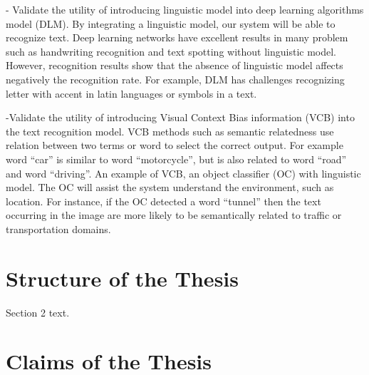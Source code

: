 \documentclass[phd,tocprelim]{cornell}
\begin{document}


- Validate the utility of introducing linguistic model into deep learning algorithms model (DLM). By integrating a linguistic model, our system will be able to recognize text. Deep learning networks have excellent results in many problem such as handwriting recognition and text spotting without linguistic model. However, recognition results show that the absence of linguistic model affects negatively the recognition rate. For example, DLM has challenges recognizing letter with accent in latin languages or symbols in a text. %

-Validate the utility of introducing Visual Context Bias information (VCB) into the text recognition model. VCB methods such as semantic relatedness \cite{leong2011measuring} use relation between two terms or word to select the correct output. For example word “car” is similar to word “motorcycle”, but is also related to word “road” and word “driving”. An example of VCB, an object classifier (OC) with linguistic model. %
The OC will assist the system understand the environment, such as location. For instance, if the OC detected a word “tunnel” then the text occurring in the image are more likely to be semantically related to traffic or transportation domains. 


















\section{Structure of the Thesis}
Section 2 text.


\section{Claims of the Thesis}
\end{document}
